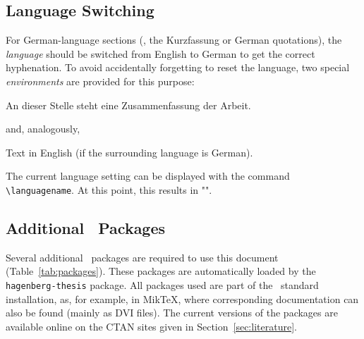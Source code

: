 \subsection{Language Switching}
\label{sec:language-switching}

For German-language sections (\eg, the Kurzfassung or German quotations), the
\emph{language} should be switched from English to German to get the correct
hyphenation. To avoid accidentally forgetting to reset the language, two special
\emph{environments} are provided for this purpose:
%
\begin{LaTeXCode}[numbers=none]
\begin{german}
    An dieser Stelle steht eine Zusammenfassung der Arbeit.
\end{german}
\end{LaTeXCode}
%
and, analogously,
%
\begin{LaTeXCode}[numbers=none]
\begin{english}
    Text in English (if the surrounding language is German).
\end{english}
\end{LaTeXCode}
%
The current language setting can be displayed with the command
\verb!\languagename!. At this point, this results in
"\texttt{\languagename}".

\subsection{Additional \latex\ Packages}

Several additional \latex\ packages are required to use this document
(Table~\ref{tab:packages}). These packages are automatically loaded by the
\texttt{hagenberg-thesis} package. All packages used are part of the \latex\
standard installation, as, for example, in MikTeX, where corresponding
documentation can also be found (mainly as DVI files). The current versions of
the packages are available online on the CTAN sites given in
Section~\ref{sec:literature}.

